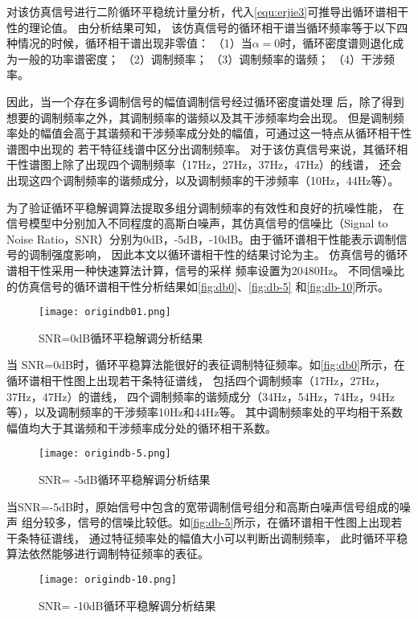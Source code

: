 对该仿真信号进行二阶循环平稳统计量分析，代入\autoref{equ:erjie3}可推导出循环谱相干性的理论值。
由分析结果可知，
该仿真信号的循环相干谱当循环频率等于以下四种情况的时候，循环相干谱出现非零值：
（1）当$\alpha=0$时，循环密度谱则退化成为一般的功率谱密度；
（2）调制频率；
（3）调制频率的谐频；
（4）干涉频率。

因此，当一个存在多调制信号的幅值调制信号经过循环密度谱处理
后，除了得到想要的调制频率之外，其调制频率的谐频以及其干涉频率均会出现。
但是调制频率处的幅值会高于其谐频和干涉频率成分处的幅值，可通过这一特点从循环相干性谱图中出现的
若干特征线谱中区分出调制频率。
对于该仿真信号来说，其循环相干性谱图上除了出现四个调制频率（17Hz，27Hz，37Hz，47Hz）的线谱，
还会出现这四个调制频率的谐频成分，以及调制频率的干涉频率（10Hz，44Hz等）。

为了验证循环平稳解调算法提取多组分调制频率的有效性和良好的抗噪性能，
在信号模型中分别加入不同程度的高斯白噪声，其仿真信号的信噪比（Signal to Noise 
Ratio，SNR）分别为0dB，-5dB，-10dB。由于循环谱相干性能表示调制信号的调制强度影响，
因此本文以循环谱相干性的结果讨论为主。
仿真信号的循环谱相干性采用一种快速算法计算，信号的采样
频率设置为20480Hz。
不同信噪比的仿真信号的循环谱相干性分析结果如\autoref{fig:db0}、\autoref{fig:db-5}
和\autoref{fig:db-10}所示。
\begin{figure}[htbp]
    \centering
    \texttt{[image: origindb01.png]}
    \caption{\label{fig:db0}SNR=0dB循环平稳解调分析结果}
\end{figure}

当 SNR=0dB时，循环平稳算法能很好的表征调制特征频率。如\autoref{fig:db0}所示，在循环谱相干性图上出现若干条特征谱线，
包括四个调制频率（17Hz，27Hz，37Hz，47Hz）的谱线，
四个调制频率的谐频成分（34Hz，54Hz，74Hz，94Hz等），以及调制频率的干涉频率10Hz和44Hz等。
其中调制频率处的平均相干系数幅值均大于其谐频和干涉频率成分处的循环相干系数。
\begin{figure}[htbp]
    \centering
    \texttt{[image: origindb-5.png]}
    \caption{\label{fig:db-5}SNR= -5dB循环平稳解调分析结果}
\end{figure}

当SNR=-5dB时，原始信号中包含的宽带调制信号组分和高斯白噪声信号组成的噪声
组分较多，信号的信噪比较低。如\autoref{fig:db-5}所示，在循环谱相干性图上出现若干条特征谱线，
通过特征频率处的幅值大小可以判断出调制频率，
此时循环平稳算法依然能够进行调制特征频率的表征。

\begin{figure}[htbp]
    \centering
    \texttt{[image: origindb-10.png]}
    \caption{\label{fig:db-10}SNR= -10dB循环平稳解调分析结果}
\end{figure}

